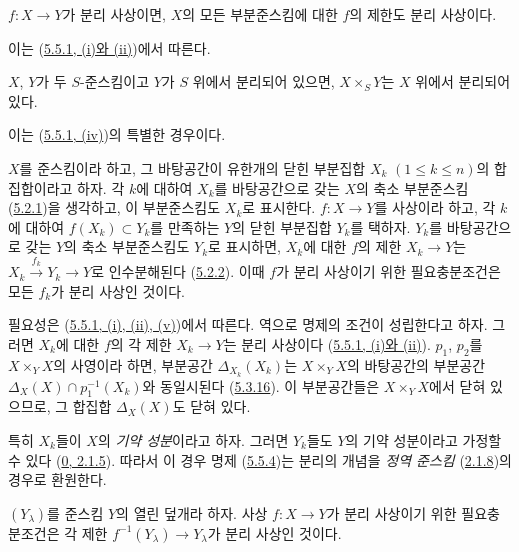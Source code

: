 \begin{corollary}[5.5.2]
\label{I.5.5.2-ko}
$f:X\to Y$가 분리 사상이면, $X$의 모든 부분준스킴에 대한 $f$의
제한도 분리 사상이다.
\end{corollary}

이는 (\hyperref[I.5.5.1-ko]{5.5.1, (i)와 (ii)})에서 따른다.

\begin{corollary}[5.5.3]
\label{I.5.5.3-ko}
$X$, $Y$가 두 $S$-준스킴이고 $Y$가 $S$ 위에서 분리되어 있으면,
$X\times_S Y$는 $X$ 위에서 분리되어 있다.
\end{corollary}

이는 (\hyperref[I.5.5.1-ko]{5.5.1, (iv)})의 특별한 경우이다.

\begin{proposition}[5.5.4]
\label{I.5.5.4-ko}
$X$를 준스킴이라 하고, 그 바탕공간이 유한개의 닫힌 부분집합
$X_k$ $(1\leq k\leq n)$의 합집합이라고 하자. 각 $k$에 대하여
$X_k$를 바탕공간으로 갖는 $X$의 축소 부분준스킴
(\hyperref[I.5.2.1-ko]{5.2.1})을 생각하고, 이 부분준스킴도 $X_k$로
표시한다. $f:X\to Y$를 사상이라 하고, 각 $k$에 대하여
$f(X_k)\subset Y_k$를 만족하는 $Y$의 닫힌 부분집합 $Y_k$를
택하자. $Y_k$를 바탕공간으로 갖는 $Y$의 축소 부분준스킴도
$Y_k$로 표시하면, $X_k$에 대한 $f$의 제한 $X_k\to Y$는
$X_k\xrightarrow{f_k}Y_k\to Y$로 인수분해된다
(\hyperref[I.5.2.2-ko]{5.2.2}). 이때 $f$가 분리 사상이기 위한
필요충분조건은 모든 $f_k$가 분리 사상인 것이다.
\end{proposition}

필요성은 (\hyperref[I.5.5.1-ko]{5.5.1, (i), (ii), (v)})에서 따른다.
역으로 명제의 조건이 성립한다고 하자. 그러면 $X_k$에 대한 $f$의
각 제한 $X_k\to Y$는 분리 사상이다
(\hyperref[I.5.5.1-ko]{5.5.1, (i)와 (ii)}). $p_1$, $p_2$를
$X\times_Y X$의 사영이라 하면, 부분공간 $\Delta_{X_k}(X_k)$는
$X\times_Y X$의 바탕공간의 부분공간
$\Delta_X(X)\cap p_1^{-1}(X_k)$와 동일시된다
(\hyperref[I.5.3.16-ko]{5.3.16}). 이 부분공간들은
$X\times_Y X$에서 닫혀 있으므로, 그 합집합 $\Delta_X(X)$도 닫혀
있다.

특히 $X_k$들이 $X$의 \emph{기약 성분}이라고 하자. 그러면
$Y_k$들도 $Y$의 기약 성분이라고 가정할 수 있다
(\hyperref[0.2.1.5-ko]{0, 2.1.5}). 따라서 이 경우 명제
(\hyperref[I.5.5.4-ko]{5.5.4})는 분리의 개념을 \emph{정역 준스킴}
(\hyperref[I.2.1.8-ko]{2.1.8})의 경우로 환원한다.


\begin{proposition}[5.5.5]
\label{I.5.5.5-ko}
$(Y_\lambda)$를 준스킴 $Y$의 열린 덮개라 하자. 사상 $f:X\to Y$가
분리 사상이기 위한 필요충분조건은 각 제한
$f^{-1}(Y_\lambda)\to Y_\lambda$가 분리 사상인 것이다.
\end{proposition}

